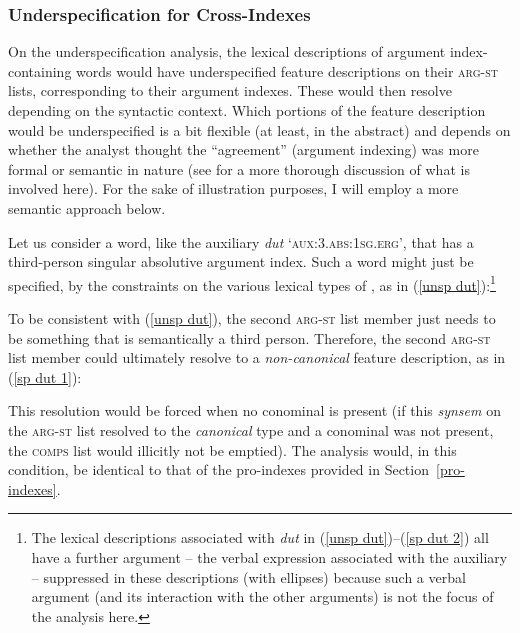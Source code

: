 \documentclass[output=paper
	        ,collection
	        ,collectionchapter
 	        ,biblatex
                ,babelshorthands
                ,newtxmath
                ,draftmode
                ,colorlinks, citecolor=brown
]{langscibook}
\begin{document}
\subsubsection{Underspecification for Cross-Indexes}

On the underspecification analysis, the lexical descriptions of argument index-containing words would have underspecified feature descriptions on their \textsc{arg-st} lists, corresponding to their argument indexes. These would then resolve depending on the syntactic context. Which portions of the feature description would be underspecified is a bit flexible (at least, in the abstract) and depends on whether the analyst thought the ``agreement'' (argument indexing) was more formal or semantic in nature (see  for a more thorough discussion of what is involved here). For the sake of illustration purposes, I will employ a more semantic approach below.

Let us consider a word, like the  auxiliary \textit{dut} `\textsc{aux:3.abs:1sg.erg}', that has a third-person singular absolutive argument index. Such a word might just be specified, by the constraints on the various lexical types of , as in (\ref{unsp dut}):\footnote{The lexical descriptions associated with \textit{dut} in (\ref{unsp dut})--(\ref{sp dut 2}) all have a further argument -- the verbal expression associated with the auxiliary -- suppressed in these descriptions (with ellipses) because such a verbal argument (and its interaction with the other arguments) is not the focus of the analysis here.}
%
\begin{exe}
\ex\label{unsp dut}
\end{exe}
%
To be consistent with (\ref{unsp dut}), the second \textsc{arg-st} list member just needs to be something that is semantically a third person. Therefore, the second \textsc{arg-st} list member could ultimately resolve to a \textit{non-canonical} feature description, as in (\ref{sp dut 1}): 
%
\begin{exe}
\ex\label{sp dut 1}
\end{exe}
%
This resolution would be forced when no conominal is present (if this \textit{synsem} on the \textsc{arg-st} list resolved to the \textit{canonical} type and a conominal was not present, the \textsc{comps} list would illicitly not be emptied). The analysis would, in this condition, be identical to that of the pro-indexes provided in Section~\ref{pro-indexes}.
\end{document}
